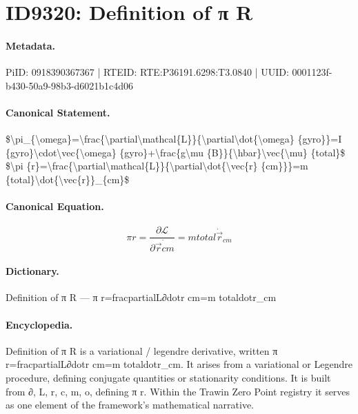 \section*{ID9320: Definition of π R}
\paragraph{Metadata.}
PiID: 0918390367367 | RTEID: RTE:P36191.6298:T3.0840 | UUID: 0001123f-b430-50a9-98b3-d6021b1c4d06

\paragraph{Canonical Statement.}
\$\textbackslash{}pi\_\{\textbackslash{}omega\}=\textbackslash{}frac\{\textbackslash{}partial\textbackslash{}mathcal\{L\}\}\{\textbackslash{}partial\textbackslash{}dot\{\textbackslash{}omega\} \{gyro\}\}=I \{gyro\}\textbackslash{}cdot\textbackslash{}vec\{\textbackslash{}omega\} \{gyro\}+\textbackslash{}frac\{g\textbackslash{}mu \{B\}\}\{\textbackslash{}hbar\}\textbackslash{}vec\{\textbackslash{}mu\} \{total\}\$ \$\textbackslash{}pi \{r\}=\textbackslash{}frac\{\textbackslash{}partial\textbackslash{}mathcal\{L\}\}\{\textbackslash{}partial\textbackslash{}dot\{\textbackslash{}vec\{r\} \{cm\}\}\}=m \{total\}\textbackslash{}dot\{\textbackslash{}vec\{r\}\}\_\{cm\}\$

\paragraph{Canonical Equation.}
\[
\pi {r}=\frac{\partial\mathcal{L}}{\partial\dot{\vec{r} {cm}}}=m {total}\dot{\vec{r}}_{cm}
\]

\paragraph{Dictionary.}
Definition of π R — π r=fracpartialL∂dotr cm=m totaldotr\_cm

\paragraph{Encyclopedia.}
Definition of π R is a variational / legendre derivative, written π r=fracpartialL∂dotr cm=m totaldotr\_cm. It arises from a variational or Legendre procedure, defining conjugate quantities or stationarity conditions. It is built from ∂, L, r, c, m, o, defining π r. Within the Trawin Zero Point registry it serves as one element of the framework's mathematical narrative.
